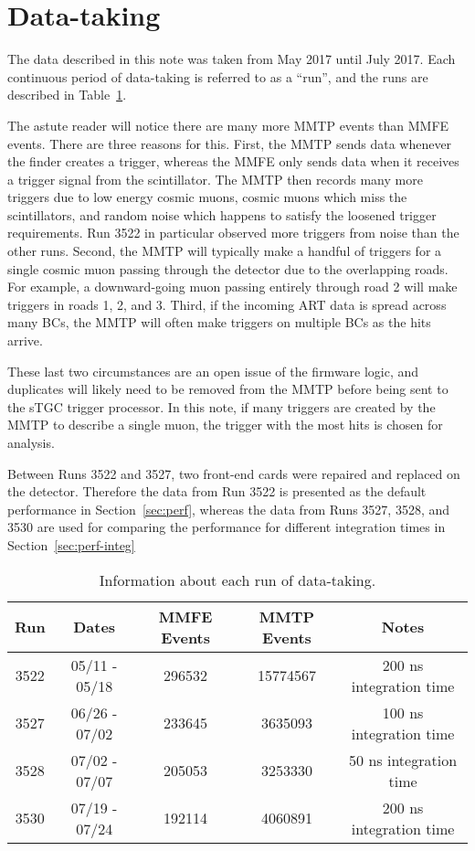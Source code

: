 \section{Data-taking}
\label{sec:data-taking}

The data described in this note was taken from May 2017 until July 2017. Each continuous period of data-taking is referred to as a ``run'', and the runs are described in Table~\ref{tab:runs}. 

The astute reader will notice there are many more MMTP events than MMFE events. There are three reasons for this. First, the MMTP sends data whenever the finder creates a trigger, whereas the MMFE only sends data when it receives a trigger signal from the scintillator. The MMTP then records many more triggers due to low energy cosmic muons, cosmic muons which miss the scintillators, and random noise which happens to satisfy the loosened trigger requirements. Run 3522 in particular observed more triggers from noise than the other runs. Second, the MMTP will typically make a handful of triggers for a single cosmic muon passing through the detector due to the overlapping roads. For example, a downward-going muon passing entirely through road 2 will make triggers in roads 1, 2, and 3. Third, if the incoming ART data is spread across many BCs, the MMTP will often make triggers on multiple BCs as the hits arrive. 

These last two circumstances are an open issue of the firmware logic, and duplicates will likely need to be removed from the MMTP before being sent to the sTGC trigger processor. In this note, if many triggers are created by the MMTP to describe a single muon, the trigger with the most hits is chosen for analysis.

Between Runs 3522 and 3527, two front-end cards were repaired and replaced on the detector. Therefore the data from Run 3522 is presented as the default performance in Section~\ref{sec:perf}, whereas the data from Runs 3527, 3528, and 3530 are used for comparing the performance for different integration times in Section~\ref{sec:perf-integ}

\begin{table}[!htpb]
\begin{center}
  \begin{tabular}{c | c | c | c | c}
    Run  & Dates         & MMFE Events & MMTP Events & Notes \\
    \hline
    3522 & 05/11 - 05/18 & 296532      & 15774567    & 200 ns integration time \\
    3527 & 06/26 - 07/02 & 233645      & 3635093     & 100 ns integration time \\
    3528 & 07/02 - 07/07 & 205053      & 3253330     & 50 ns integration time \\
    3530 & 07/19 - 07/24 & 192114      & 4060891     & 200 ns integration time \\
  \end{tabular}
  \caption{Information about each run of data-taking.}
\label{tab:runs}
\end{center}
\end{table}

